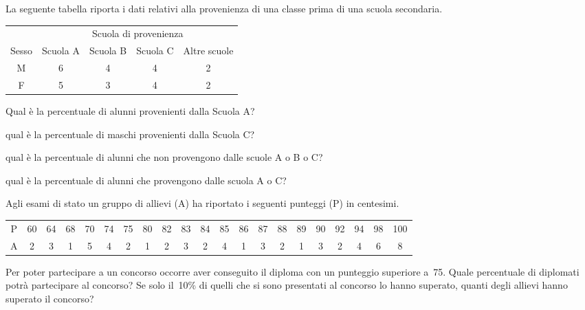 \begin{esercizio}
 \label{ese:3.96}
 La seguente tabella riporta i dati relativi alla provenienza di una classe 
 prima di una scuola secondaria.

\begin{tabular*}{.9\textwidth}{@{\extracolsep{\fill}}*{5}{c}}
 \toprule
&\multicolumn{4}{c}{Scuola di provenienza}\\
Sesso & Scuola A & Scuola B & Scuola C & Altre scuole\\
\midrule
M& 6& 4& 4& 2\\
F& 5& 3& 4& 2\\
\bottomrule
\end{tabular*}

\begin{enumeratea}
 \item Qual è la percentuale di alunni provenienti dalla Scuola A?
 \item qual è la percentuale di maschi provenienti dalla Scuola C?
 \item qual è la percentuale di alunni che non provengono dalle scuole 
 A o B o C?
 \item qual è la percentuale di alunni che provengono dalle scuola A o C?
\end{enumeratea}
\end{esercizio}

\begin{esercizio}
 \label{ese:3.97}
 Agli esami di stato un gruppo di allievi (A) ha riportato i seguenti punteggi 
 (P) in centesimi.

{\tiny\selectfont
\begin{tabular*}{.95\textwidth}{@{\extracolsep{\fill}}*{21}{c}}
\toprule
P& 60& 64& 68& 70& 74& 75& 80& 82& 83& 84& 85& 86& 87& 88& 89& 90& 92& 94& 98& 
100\\
A& 2& 3& 1& 5& 4& 2& 1& 2& 3& 2& 4& 1& 3& 2& 1& 3& 2& 4& 6& 8\\
\bottomrule
\end{tabular*}}
\vspace{1.05ex}

Per poter partecipare a un concorso occorre aver conseguito il diploma con un
 punteggio superiore a~75. Quale percentuale di diplomati
potrà partecipare al concorso? Se solo il~10\% di quelli che si sono 
presentati al concorso lo hanno superato, quanti degli allievi hanno superato 
il concorso?
\end{esercizio}

